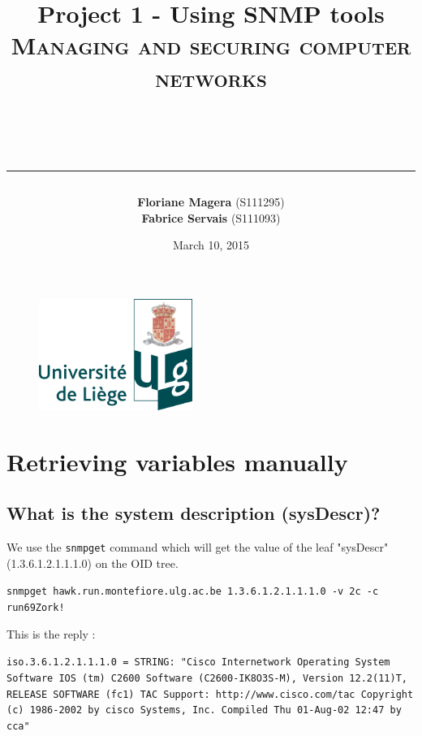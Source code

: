 \documentclass[a4paper,titlepage]{article}
\begin{document}
\begin{titlepage}

\begin{figure}
\centering
\includegraphics[width=5cm]{logo-ulg.png}
\end{figure}



\title{
\vspace{0.2cm}
\LARGE{\textbf{Project 1 - Using SNMP tools}} \\ \textsc{Managing and securing computer networks}
\author{\textbf{Floriane Magera} \small{(S111295})\\\textbf{Fabrice Servais} \small{(S111093})}\\
\date{March 10, 2015}
\rule{15cm}{1.5pt}
}

\end{titlepage}

\pagestyle{fancy}

\maketitle

\section{Retrieving variables manually}

	\subsection{What is the system description (sysDescr)?}
We use the \texttt{snmpget} command which will get the value of the leaf "sysDescr" (1.3.6.1.2.1.1.1.0) on the OID tree.
\begin{center}
	\texttt{snmpget hawk.run.montefiore.ulg.ac.be 1.3.6.1.2.1.1.1.0 -v 2c -c run69Zork!}
\end{center}
This is the reply : 
\begin{center}
	\texttt{iso.3.6.1.2.1.1.1.0 = STRING: "Cisco Internetwork Operating System Software 
IOS (tm) C2600 Software (C2600-IK8O3S-M), Version 12.2(11)T,  RELEASE SOFTWARE (fc1)
TAC Support: http://www.cisco.com/tac
Copyright (c) 1986-2002 by cisco Systems, Inc.
Compiled Thu 01-Aug-02 12:47 by cca"}
\end{center}
\end{document}
